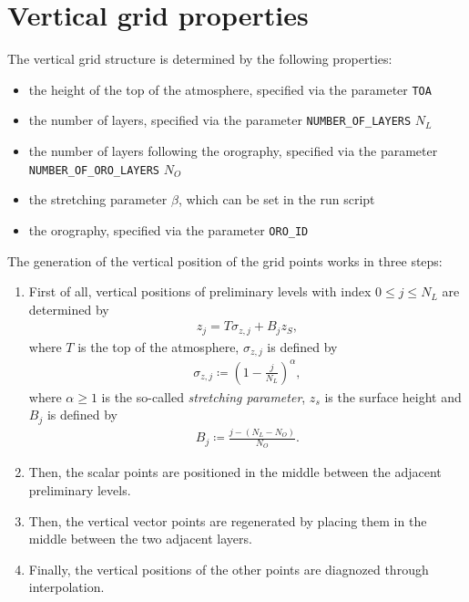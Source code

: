 \documentclass[10pt]{report}
\begin{document}
\section{Vertical grid properties}
\label{sec:vertical_grid_properties}

The vertical grid structure is determined by the following properties:

\begin{itemize}
\item the height of the top of the atmosphere, specified via the parameter \texttt{TOA}
\item the number of layers, specified via the parameter \texttt{NUMBER\_OF\_LAYERS} $N_L$
\item the number of layers following the orography, specified via the parameter \texttt{NUMBER\_OF\_ORO\_LAYERS} $N_O$
\item the stretching parameter $\beta$, which can be set in the run script
\item the orography, specified via the parameter \texttt{ORO\_ID}
\end{itemize}

The generation of the vertical position of the grid points works in three steps:
%
\begin{enumerate}
\item First of all, vertical positions of preliminary levels with index $0 \leq j \leq N_L$ are determined by
%
\begin{align}
z_j = T\sigma_{z, j} + B_jz_S,
\end{align}
%
where $T$ is the top of the atmosphere, $\sigma_{z, j}$ is defined by
%
\begin{align}
\sigma_{z, j} \coloneqq \left(1 - \frac{j}{N_L}\right)^\alpha,
\end{align}
%
where $\alpha \geq 1$ is the so-called \textit{stretching parameter}, $z_s$ is the surface height and $B_j$ is defined by
%
\begin{align}
B_j \coloneqq \frac{j - \left(N_L - N_O\right)}{N_O}.
\end{align}
%
\item Then, the scalar points are positioned in the middle between the adjacent preliminary levels.
\item Then, the vertical vector points are regenerated by placing them in the middle between the two adjacent layers.
\item Finally, the vertical positions of the other points are diagnozed through interpolation.
\end{enumerate}
\end{document}
